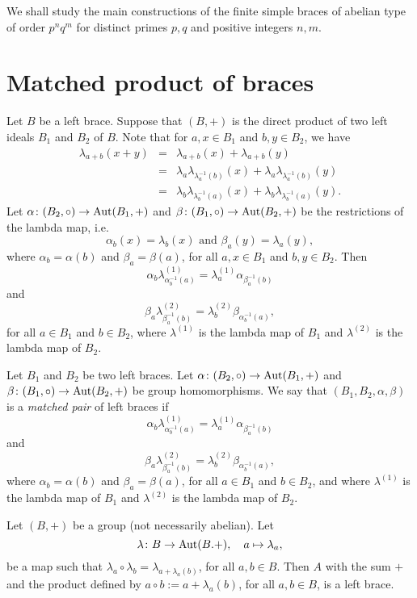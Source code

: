We shall study the main constructions of the finite simple braces 
of abelian type of order $p^nq^m$ for distinct primes $p,q$ and positive integers $n,m$.
  
\section*{Matched product of braces} 

Let $B$ be a left brace. Suppose that $(B,+)$ is the direct product of two left ideals $B_1$ and $B_2$ of $B$.
Note that for $a,x\in B_1$ and $b,y\in B_2$, we have 
\begin{eqnarray*}
	\lambda_{a+b}(x+y)&=&\lambda_{a+b}(x)+\lambda_{a+b}(y)\\
	&=&\lambda_{a}\lambda_{\lambda^{-1}_{a}(b)}(x)+\lambda_{a}\lambda_{\lambda^{-1}_{a}(b)}(y)\\
	&=&\lambda_{b}\lambda_{\lambda^{-1}_{b}(a)}(x)+\lambda_{b}\lambda_{\lambda^{-1}_{b}(a)}(y).
\end{eqnarray*}	
Let $\alpha\colon (B_2,\circ)\rightarrow\operatorname{Aut}(B_1,+)$ and $\beta\colon (B_1,\circ)\rightarrow\operatorname{Aut}(B_2,+)$ be the restrictions of the lambda map, i.e. 
$$\alpha_b(x)=\lambda_b(x)\mbox{ and }\beta_a(y)=\lambda_a(y),$$
where $\alpha_b=\alpha(b)$ and $\beta_a=\beta(a)$, for all $a,x\in B_1$ and $b,y\in B_2$. Then
$$\alpha_b\lambda^{(1)}_{\alpha^{-1}_b(a)}=\lambda^{(1)}_a\alpha_{\beta^{-1}_a(b)}$$
and	
$$\beta_a\lambda^{(2)}_{\beta^{-1}_a(b)}=\lambda^{(2)}_b\beta_{\alpha^{-1}_b(a)},$$
for all $a\in B_1$ and $b\in B_2$, where $\lambda^{(1)}$ is the lambda map of $B_1$ and $\lambda^{(2)}$ is the lambda map of $B_2$.

\begin{definition}\label{def:matchedpair}
	Let $B_1$ and $B_2$ be two left braces. Let $\alpha\colon (B_2,\circ)\rightarrow \operatorname{Aut}(B_1,+)$ and $\beta\colon (B_1,\circ)\rightarrow \operatorname{Aut}(B_2,+)$ be group homomorphisms. We say that $(B_1,B_2,\alpha,\beta)$ is a \emph{matched pair} of left braces if
	$$\alpha_b\lambda^{(1)}_{\alpha^{-1}_b(a)}=\lambda^{(1)}_a\alpha_{\beta^{-1}_a(b)}$$
	and	
	$$\beta_a\lambda^{(2)}_{\beta^{-1}_a(b)}=\lambda^{(2)}_b\beta_{\alpha^{-1}_b(a)},$$
	where $\alpha_b=\alpha(b)$ and $\beta_a=\beta(a)$, for all $a\in B_1$ and $b\in B_2$, and where $\lambda^{(1)}$ is the lambda map of $B_1$ and $\lambda^{(2)}$ is the lambda map of $B_2$.	
\end{definition}

\begin{lemma} \label{lemma:lambda}
	Let $(B,+)$ be a group (not necessarily abelian). Let
	$$\lambda\colon B\rightarrow \operatorname{Aut}(B.+),\quad a\mapsto \lambda_a,$$ 
	be a map such that
	$\lambda_a\circ\lambda_b=\lambda_{a+\lambda_a(b)}$, for all $a,b\in B$. Then $A$ with the sum $+$ and the product defined by $a\circ b:=a+\lambda_a(b)$, for all $a,b\in B$, is a left brace.	
\end{lemma}	

